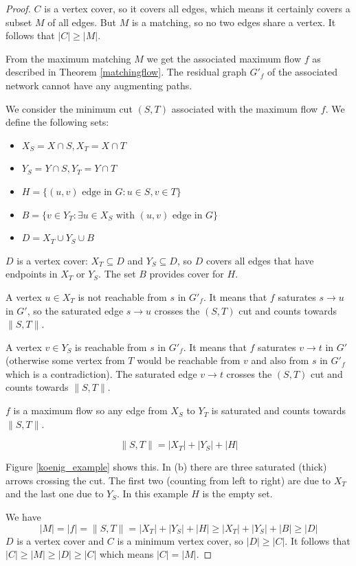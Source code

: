 \begin{proof}

$C$ is a vertex cover, so it covers all edges, which means it certainly covers a subset $M$ of all edges. But $M$ is a matching, so no two edges share a vertex. It follows that $|C| \geq |M|$.

From the maximum matching $M$ we get the associated maximum flow $f$ as described in Theorem \ref{matchingflow}. The residual graph $G'_f$ of the associated network cannot have any augmenting paths. 

We consider the minimum cut $(S, T)$ associated with the maximum flow $f$. We define the following sets:

\begin{itemize}
	\item $X_S = X \cap S, X_T = X \cap T$
	\item $Y_S = Y \cap S, Y_T = Y \cap T$
	\item $H = \{(u, v) \text{ edge in } G: u \in S, v \in T\}$
	\item $B = \{v \in Y_T: \exists u \in X_S \text{ with } (u, v) \text{ edge in } G\}$
	\item $D = X_T \cup Y_S \cup B$
\end{itemize}	

\noindent $D$ is a vertex cover: $X_T \subseteq D$ and $Y_S \subseteq D$, so $D$ covers all edges that have endpoints in $X_T$ or $Y_S$. The set $B$ provides cover for $H$. 

A vertex $u \in X_T$ is not reachable from $s$ in $G'_f$. It means that $f$ saturates $s \rightarrow u$ in $G'$, so the saturated edge $s \rightarrow u$ crosses the $(S, T)$ cut and counts towards $\|S, T\|$.

A vertex $v \in Y_S$ is reachable from $s$ in $G'_f$. It means that $f$ saturates $v \rightarrow t$ in $G'$ (otherwise some vertex from $T$ would be reachable from $v$ and also from $s$ in $G'_f$ which is a contradiction). The saturated edge $v \rightarrow t$ crosses the $(S, T)$ cut and counts towards $\|S, T\|$.

$f$ is a maximum flow so any edge from $X_S$ to $Y_T$ is saturated and counts towards $\|S, T\|$.

$$
\|S, T\| = |X_T| + |Y_S| + |H|
$$

\noindent Figure \ref{koenig_example} shows this. In (b) there are three saturated (thick) arrows crossing the cut. The first two (counting from left to right) are due to $X_T$ and the last one due to $Y_S$. In this example $H$ is the empty set.

We have
$$
|M| = |f| = \|S, T\| = |X_T| + |Y_S| + |H| \geq |X_T| + |Y_S| + |B| \geq |D|
$$
\noindent $D$ is a vertex cover and $C$ is a minimum vertex cover, so $|D| \geq |C|$. It follows that $|C| \geq |M| \geq |D| \geq |C|$ which means $|C| = |M|$.
\end{proof}

